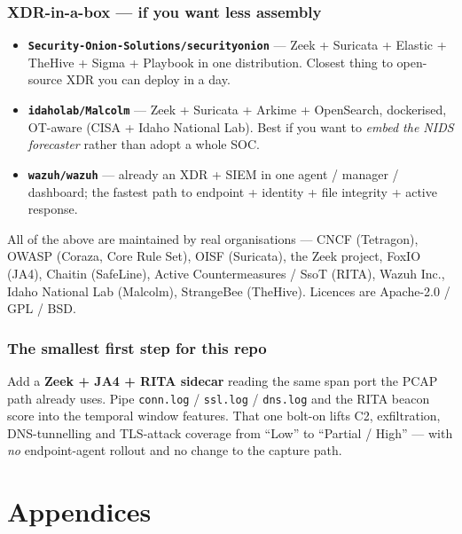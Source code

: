\documentclass[11pt,a4paper]{article}
\begin{document}
\section{XDR-in-a-box --- if you want less assembly}

\begin{itemize}
\item \textbf{\texttt{Security-Onion-Solutions/securityonion}} --- Zeek +
  Suricata + Elastic + TheHive + Sigma + Playbook in one distribution. Closest
  thing to open-source XDR you can deploy in a day.
\item \textbf{\texttt{idaholab/Malcolm}} --- Zeek + Suricata + Arkime +
  OpenSearch, dockerised, OT-aware (CISA + Idaho National Lab). Best if you want
  to \emph{embed the NIDS forecaster} rather than adopt a whole SOC.
\item \textbf{\texttt{wazuh/wazuh}} --- already an XDR + SIEM in one
  agent / manager / dashboard; the fastest path to endpoint + identity + file
  integrity + active response.
\end{itemize}

All of the above are maintained by real organisations --- CNCF (Tetragon), OWASP
(Coraza, Core Rule Set), OISF (Suricata), the Zeek project, FoxIO (JA4), Chaitin
(SafeLine), Active Countermeasures / SsoT (RITA), Wazuh Inc., Idaho National Lab
(Malcolm), StrangeBee (TheHive). Licences are Apache-2.0 / GPL / BSD.

\section{The smallest first step for this repo}

Add a \textbf{Zeek + JA4 + RITA sidecar} reading the same span port the PCAP path
already uses. Pipe \texttt{conn.log} / \texttt{ssl.log} / \texttt{dns.log} and
the RITA beacon score into the temporal window features. That one bolt-on lifts
C2, exfiltration, DNS-tunnelling and TLS-attack coverage from ``Low'' to
``Partial / High'' --- with \emph{no} endpoint-agent rollout and no change to the
capture path.

\clearpage
\part*{Appendices}
\end{document}
